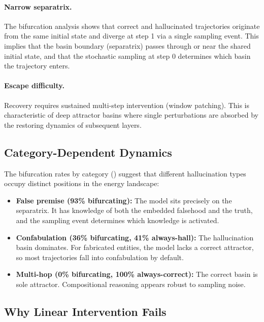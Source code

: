 \documentclass[11pt,a4paper]{article}
\begin{document}
\paragraph{Narrow separatrix.} The bifurcation analysis shows that correct and hallucinated trajectories originate from the same initial state and diverge at step 1 via a single sampling event. This implies that the basin boundary (separatrix) passes through or near the shared initial state, and that the stochastic sampling at step 0 determines which basin the trajectory enters.

\paragraph{Escape difficulty.} Recovery requires sustained multi-step intervention (window patching). This is characteristic of deep attractor basins where single perturbations are absorbed by the restoring dynamics of subsequent layers.

\subsection{Category-Dependent Dynamics}

The bifurcation rates by category () suggest that different hallucination types occupy distinct positions in the energy landscape:

\begin{itemize}
    \item \textbf{False premise (93\% bifurcating):} The model sits precisely on the separatrix. It has knowledge of both the embedded falsehood and the truth, and the sampling event determines which knowledge is activated.
    \item \textbf{Confabulation (36\% bifurcating, 41\% always-hall):} The hallucination basin dominates. For fabricated entities, the model lacks a correct attractor, so most trajectories fall into confabulation by default.
    \item \textbf{Multi-hop (0\% bifurcating, 100\% always-correct):} The correct basin is sole attractor. Compositional reasoning appears robust to sampling noise.
\end{itemize}

\subsection{Why Linear Intervention Fails}
\end{document}
